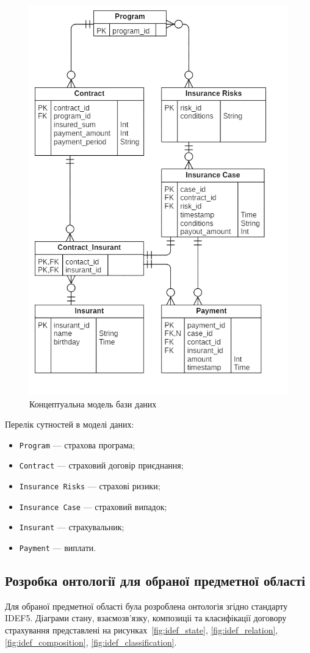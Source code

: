 \begin{figure}[H]
    \centering
        \includegraphics[width=0.6\linewidth]{er}
    \caption{Концептуальна модель бази даних}
    \label{fig:er}
\end{figure}

Перелік сутностей в моделі даних: 
\begin{itemize}
  \item \texttt{Program} --- страхова програма;
  \item \texttt{Contract} --- страховий договір приєднання;
  \item \texttt{Insurance Risks} --- страхові ризики;
  \item \texttt{Insurance Case} --- страховий випадок;
  \item \texttt{Insurant} --- страхувальник;
  \item \texttt{Payment} --- виплати.
\end{itemize}

\subsection*{Розробка онтології для обраної предметної області}
Для обраної предметної області була розроблена онтологія згідно стандарту IDEF5. 
Діаграми стану, взаємозв'язку, композиціі та класифікації договору страхування представлені на рисунках~\ref{fig:idef_state}, \ref{fig:idef_relation}, \ref{fig:idef_composition}, \ref{fig:idef_classification}.


